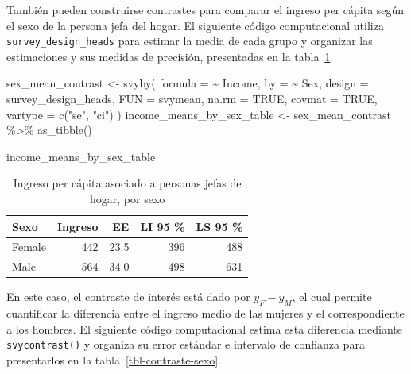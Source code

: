 \documentclass[
  spanish,
  11pt,
  letterpaper,
  oneside,
  open=any]{scrbook}
\newenvironment{Shaded}{\begin{snugshade}}{\end{snugshade}}
\newcommand{\AttributeTok}[1]{\textcolor[rgb]{0.40,0.45,0.13}{#1}}
\newcommand{\ConstantTok}[1]{\textcolor[rgb]{0.56,0.35,0.01}{#1}}
\newcommand{\FunctionTok}[1]{\textcolor[rgb]{0.28,0.35,0.67}{#1}}
\newcommand{\NormalTok}[1]{\textcolor[rgb]{0.00,0.23,0.31}{#1}}
\newcommand{\OtherTok}[1]{\textcolor[rgb]{0.00,0.23,0.31}{#1}}
\newcommand{\SpecialCharTok}[1]{\textcolor[rgb]{0.37,0.37,0.37}{#1}}
\newcommand{\StringTok}[1]{\textcolor[rgb]{0.13,0.47,0.30}{#1}}
\begin{document}
También pueden construirse contrastes para comparar el ingreso per
cápita según el sexo de la persona jefa del hogar. El siguiente código
computacional utiliza \texttt{survey\_design\_heads} para estimar la
media de cada grupo y organizar las estimaciones y sus medidas de
precisión, presentadas en la tabla~\ref{tbl-prom-sexo}.

\begin{Shaded}
\begin{Highlighting}[]
\NormalTok{sex\_mean\_contrast }\OtherTok{\textless{}{-}} \FunctionTok{svyby}\NormalTok{(}
  \AttributeTok{formula =} \SpecialCharTok{\textasciitilde{}}\NormalTok{ Income,}
  \AttributeTok{by =} \SpecialCharTok{\textasciitilde{}}\NormalTok{ Sex,}
  \AttributeTok{design =}\NormalTok{ survey\_design\_heads,}
  \AttributeTok{FUN =}\NormalTok{ svymean,}
  \AttributeTok{na.rm =} \ConstantTok{TRUE}\NormalTok{,}
  \AttributeTok{covmat =} \ConstantTok{TRUE}\NormalTok{,}
  \AttributeTok{vartype =} \FunctionTok{c}\NormalTok{(}\StringTok{"se"}\NormalTok{, }\StringTok{"ci"}\NormalTok{)}
\NormalTok{)}
\NormalTok{income\_means\_by\_sex\_table }\OtherTok{\textless{}{-}}\NormalTok{ sex\_mean\_contrast }\SpecialCharTok{\%\textgreater{}\%}
  \FunctionTok{as\_tibble}\NormalTok{()}

\NormalTok{income\_means\_by\_sex\_table}
\end{Highlighting}
\end{Shaded}

{

\begin{longtable}[]{@{}lrrrr@{}}

\caption{\label{tbl-prom-sexo}Ingreso per cápita asociado a personas
jefas de hogar, por sexo}

\tabularnewline

\toprule\noalign{}
Sexo & Ingreso & EE & LI 95 \% & LS 95 \% \\
\midrule\noalign{}
\endhead
\bottomrule\noalign{}
\endlastfoot
Female & 442 & 23.5 & 396 & 488 \\
Male & 564 & 34.0 & 498 & 631 \\

\end{longtable}

}

En este caso, el contraste de interés está dado por
\(\bar{y}_{F} - \bar{y}_{M}\), el cual permite cuantificar la diferencia
entre el ingreso medio de las mujeres y el correspondiente a los
hombres. El siguiente código computacional estima esta diferencia
mediante \texttt{svycontrast()} y organiza su error estándar e intervalo
de confianza para presentarlos en la tabla~\ref{tbl-contraste-sexo}.
\end{document}
